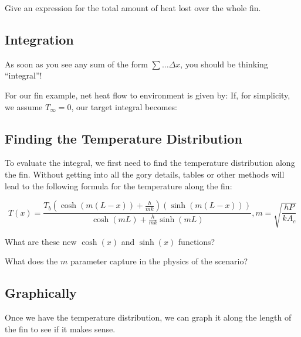 \vfill

Give an expression for the total amount of heat lost over
  the whole fin.

\vfill
\vfill


\newpage


\subsection*{Integration}

As soon as you see any sum of the form $\sum \ldots \Delta x$, you
should be thinking ``integral''!

\problem For our fin example, net heat flow to environment is given
by:
\vfill
If, for simplicity, we assume $T_{\infty} = 0$, our target integral becomes:
\vfill

\newpage

\subsection*{Finding the Temperature Distribution}
To evaluate the integral, we first need to find the temperature
distribution along the fin.  Without getting into all the gory
details, tables or other methods will lead to the following formula
for the temperature along the fin:

$$T(x) = \frac{T_b \left(\cosh(m(L-x)) + \frac{h}{mk}\right)\left(\sinh(m(L-x))\right)}{\cosh(mL) + \frac{h}{mk} \sinh(mL)}, m = \sqrt{\frac{hP}{k A_c}}$$

\problem What are these new $\cosh(x)$ and $\sinh(x)$ functions?
\vfill

What does the $m$ parameter capture in the physics of the scenario?
\vfill



\newpage
\subsection*{Graphically}
Once we have the temperature distribution, we can graph it along the
length of the fin to see if it makes sense.

